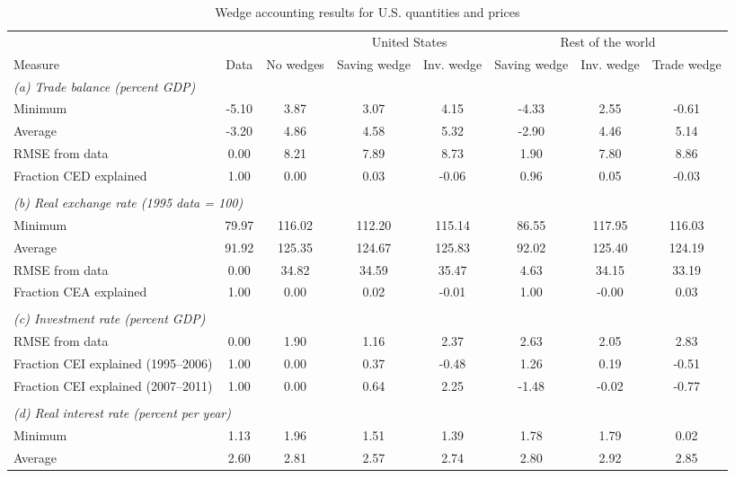 \begin{table}[p]
\footnotesize
\begin{center}
\begin{threeparttable}\caption{Wedge accounting results for U.S. quantities and prices}
\label{tab:tb-results-1}
\begin{tabular}{lccccccc}
\toprule
& & & \multicolumn{2}{c}{United States} & \multicolumn{3}{c}{Rest of the world}\\
\cmidrule(rl){4-5}\cmidrule(rl){6-8}
Measure & Data & No wedges & Saving wedge & Inv. wedge & Saving wedge & Inv. wedge & Trade wedge\\
\midrule
\multicolumn{8}{l}{\textit{(a) Trade balance (percent GDP)}}\\
Minimum& -5.10 & 3.87 & 3.07 & 4.15 & -4.33 & 2.55 & -0.61\\
Average& -3.20 & 4.86 & 4.58 & 5.32 & -2.90 & 4.46 & 5.14\\
RMSE from data& 0.00 & 8.21 & 7.89 & 8.73 & 1.90 & 7.80 & 8.86\\
Fraction CED explained& 1.00 & 0.00 & 0.03 & -0.06 & 0.96 & 0.05 & -0.03\\
\\
\multicolumn{8}{l}{\textit{(b) Real exchange rate (1995 data = 100)}}\\
Minimum& 79.97 & 116.02 & 112.20 & 115.14 & 86.55 & 117.95 & 116.03\\
Average& 91.92 & 125.35 & 124.67 & 125.83 & 92.02 & 125.40 & 124.19\\
RMSE from data& 0.00 & 34.82 & 34.59 & 35.47 & 4.63 & 34.15 & 33.19\\
Fraction CEA explained& 1.00 & 0.00 & 0.02 & -0.01 & 1.00 & -0.00 & 0.03\\
\\
\multicolumn{8}{l}{\textit{(c) Investment rate (percent GDP)}}\\
RMSE from data& 0.00 & 1.90 & 1.16 & 2.37 & 2.63 & 2.05 & 2.83\\
Fraction CEI explained (1995--2006)& 1.00 & 0.00 & 0.37 & -0.48 & 1.26 & 0.19 & -0.51\\
Fraction CEI explained (2007--2011)& 1.00 & 0.00 & 0.64 & 2.25 & -1.48 & -0.02 & -0.77\\
\\
\multicolumn{8}{l}{\textit{(d) Real interest rate (percent per year)}}\\
Minimum& 1.13 & 1.96 & 1.51 & 1.39 & 1.78 & 1.79 & 0.02\\
Average& 2.60 & 2.81 & 2.57 & 2.74 & 2.80 & 2.92 & 2.85\\

\end{tabular}
\end{threeparttable}
\end{center}
\end{table}
